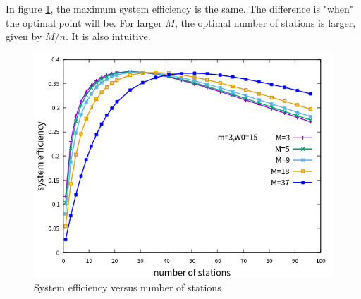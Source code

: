 In figure \ref{fig_n_M_eff}, the maximum system efficiency is the same. 
The difference is "when" the optimal point will be. 
For larger $M$, the optimal number of stations is larger, given by $M/n$. It is also intuitive.

\begin{figure}[!h]
\centering
\includegraphics[scale=.85]{./figure/n_M_eff_perf.png}
\caption{System efficiency versus number of stations}
\label{fig_n_M_eff}
\end{figure}

